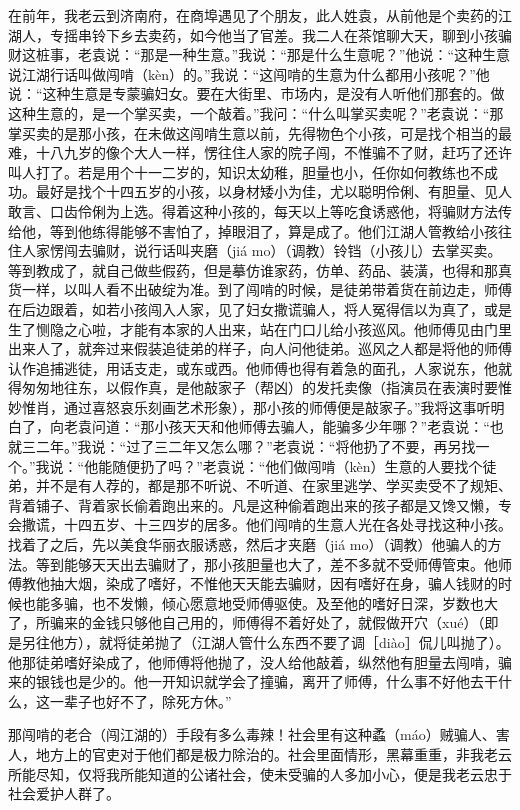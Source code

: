 \documentclass[12pt,UTF8]{ctexbook}
\begin{document}
在前年，我老云到济南府，在商埠遇见了个朋友，此人姓袁，从前他是个卖药的江湖人，专摇串铃下乡去卖药，如今他当了官差。我二人在茶馆聊大天，聊到小孩骗财这桩事，老袁说：“那是一种生意。”我说：“那是什么生意呢？”他说：“这种生意说江湖行话叫做闯啃（kèn）的。”我说：“这闯啃的生意为什么都用小孩呢？”他说：“这种生意是专蒙骗妇女。要在大街里、市场内，是没有人听他们那套的。做这种生意的，是一个掌买卖，一个敲着。”我问：“什么叫掌买卖呢？”老袁说：“那掌买卖的是那小孩，在未做这闯啃生意以前，先得物色个小孩，可是找个相当的最难，十八九岁的像个大人一样，愣往住人家的院子闯，不惟骗不了财，赶巧了还许叫人打了。若是用个十一二岁的，知识太幼稚，胆量也小，任你如何教练也不成功。最好是找个十四五岁的小孩，以身材矮小为佳，尤以聪明伶俐、有胆量、见人敢言、口齿伶俐为上选。得着这种小孩的，每天以上等吃食诱惑他，将骗财方法传给他，等到他练得能够不害怕了，掉眼泪了，算是成了。他们江湖人管教给小孩往住人家愣闯去骗财，说行话叫夹磨（jiá mo）（调教）铃铛（小孩儿）去掌买卖。等到教成了，就自己做些假药，但是摹仿谁家药，仿单、药品、装潢，也得和那真货一样，以叫人看不出破绽为准。到了闯啃的时候，是徒弟带着货在前边走，师傅在后边跟着，如若小孩闯入人家，见了妇女撒谎骗人，将人冤得信以为真了，或是生了恻隐之心啦，才能有本家的人出来，站在门口儿给小孩巡风。他师傅见由门里出来人了，就奔过来假装追徒弟的样子，向人问他徒弟。巡风之人都是将他的师傅认作追捕逃徒，用话支走，或东或西。他师傅也得有着急的面孔，人家说东，他就得匆匆地往东，以假作真，是他敲家子（帮凶）的发托卖像（指演员在表演时要惟妙惟肖，通过喜怒哀乐刻画艺术形象），那小孩的师傅便是敲家子。”我将这事听明白了，向老袁问道：“那小孩天天和他师傅去骗人，能骗多少年哪？”老袁说：“也就三二年。”我说：“过了三二年又怎么哪？”老袁说：“将他扔了不要，再另找一个。”我说：“他能随便扔了吗？”老袁说：“他们做闯啃（kèn）生意的人要找个徒弟，并不是有人荐的，都是那不听说、不听道、在家里逃学、学买卖受不了规矩、背着铺子、背着家长偷着跑出来的。凡是这种偷着跑出来的孩子都是又馋又懒，专会撒谎，十四五岁、十三四岁的居多。他们闯啃的生意人光在各处寻找这种小孩。找着了之后，先以美食华丽衣服诱惑，然后才夹磨（jiá mo）（调教）他骗人的方法。等到能够天天出去骗财了，那小孩胆量也大了，差不多就不受师傅管束。他师傅教他抽大烟，染成了嗜好，不惟他天天能去骗财，因有嗜好在身，骗人钱财的时候也能多骗，也不发懒，倾心愿意地受师傅驱使。及至他的嗜好日深，岁数也大了，所骗来的金钱只够他自己用的，师傅得不着好处了，就假做开穴（xué）（即是另往他方），就将徒弟抛了（江湖人管什么东西不要了调［diào］侃儿叫抛了）。他那徒弟嗜好染成了，他师傅将他抛了，没人给他敲着，纵然他有胆量去闯啃，骗来的银钱也是少的。他一开知识就学会了撞骗，离开了师傅，什么事不好他去干什么，这一辈子也好不了，除死方休。”

那闯啃的老合（闯江湖的）手段有多么毒辣！社会里有这种蟊（máo）贼骗人、害人，地方上的官吏对于他们都是极力除治的。社会里面情形，黑幕重重，非我老云所能尽知，仅将我所能知道的公诸社会，使未受骗的人多加小心，便是我老云忠于社会爱护人群了。
\end{document}

